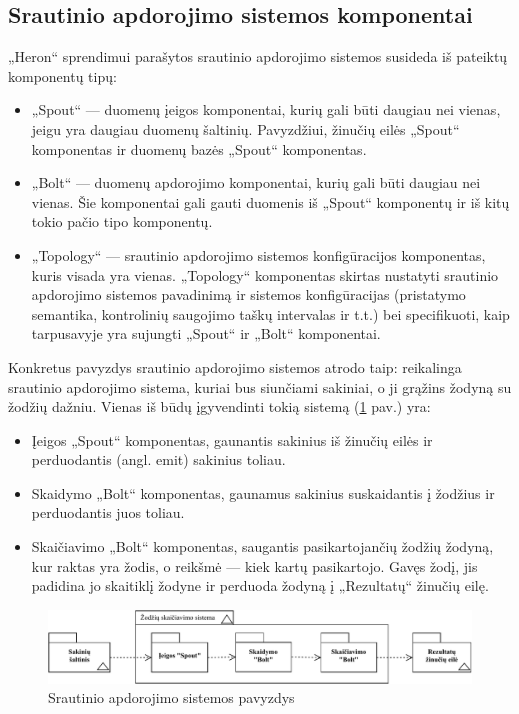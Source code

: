 \documentclass{VUMIFPSbakalaurinis}
\begin{document}
\subsection{Srautinio apdorojimo sistemos komponentai}
„Heron“ sprendimui parašytos srautinio apdorojimo sistemos susideda iš pateiktų komponentų tipų:
\begin{itemize}
    \item „Spout“ — duomenų įeigos komponentai, kurių gali būti daugiau nei vienas, jeigu yra daugiau duomenų šaltinių. Pavyzdžiui, žinučių eilės „Spout“ komponentas ir duomenų bazės „Spout“ komponentas.
    \item „Bolt“ — duomenų apdorojimo komponentai, kurių gali būti daugiau nei vienas. Šie komponentai gali gauti duomenis iš „Spout“ komponentų ir iš kitų tokio pačio tipo komponentų.
    \item „Topology“ — srautinio apdorojimo sistemos konfigūracijos komponentas, kuris visada yra vienas. „Topology“ komponentas skirtas nustatyti srautinio apdorojimo sistemos pavadinimą ir sistemos konfigūracijas (pristatymo semantika, kontrolinių saugojimo taškų intervalas ir t.t.) bei specifikuoti, kaip tarpusavyje yra sujungti „Spout“ ir „Bolt“ komponentai. 
\end{itemize}\par
Konkretus pavyzdys srautinio apdorojimo sistemos atrodo taip:
reikalinga srautinio apdorojimo sistema, kuriai bus siunčiami sakiniai, o ji grąžins žodyną su žodžių dažniu. Vienas iš būdų įgyvendinti tokią sistemą (\ref{img:system-example} pav.) yra:
\begin{itemize}
    \item Įeigos „Spout“ komponentas, gaunantis sakinius iš žinučių eilės ir perduodantis (angl. emit) sakinius toliau.
    \item Skaidymo „Bolt“ komponentas, gaunamus sakinius suskaidantis į žodžius ir perduodantis juos toliau.
    \item Skaičiavimo „Bolt“ komponentas, saugantis pasikartojančių žodžių žodyną, kur raktas yra žodis, o reikšmė — kiek kartų pasikartojo. Gavęs žodį, jis padidina jo skaitiklį žodyne ir perduoda žodyną į „Rezultatų“ žinučių eilę.
\end{itemize}
\begin{figure}[H]
    \centering
    \includegraphics[width=1\textwidth]{img/pavyzdine_sistema.pdf}
    \caption{Srautinio apdorojimo sistemos pavyzdys}
    \label{img:system-example}
\end{figure}
\end{document}
